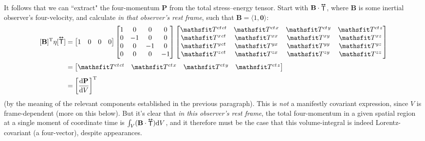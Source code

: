\documentclass[12pt]{article}
\renewcommand{\vv}[1]{\mathbf{#1}}
\newcommand{\dd}[1]{\mathrm{d}#1}
\newcommand{\tightoverset}[2]{%
  \mathop{#2}\limits^{\vbox to -.5ex{\kern-0.75ex\hbox{$#1$}\vss}}}
\newcommand{\inlinedy}[1]{\tightoverset{\text{\tiny$\bm\leftrightarrow$}}{#1}}
\newcommand{\capdy}[1]{ \overset{ \text{\tiny$\bm\leftrightarrow$} }{\vphantom{\text{\small{A}}}\smash{#1}} }
\begin{document}
It follows that we can ``extract" the four-momentum $\vv P$ from the total stress--energy tensor. Start with $\vv B \cdot {\inlinedy{\mathsf{T}}} $, where $\vv B$ is some inertial observer's four-velocity, and calculate \emph{in that observer's rest frame}, such that ${ \vv B = \langle 1, \vv 0 \rangle }$:
\begin{equation*}
\begin{aligned}
\, [ \vv B ]^{\mathrm{T}} \eta [ \capdy{\mathsf{T}}  ]
&=
\begin{bmatrix}
1 & 0 & 0 & 0
\end{bmatrix}
\begin{bmatrix}
1 & 0 & 0 & 0 \\
0 & -1 & 0 & 0 \\
0 & 0 & -1 & 0 \\
0 & 0 & 0 & -1
\end{bmatrix}
\begin{bmatrix}
\mathsfit T^{ct \mkern1.5mu ct} & \mathsfit T^{ct \mkern1.5mu x} & \mathsfit T^{ct \mkern1.5mu y} & \mathsfit T^{ct \mkern1.5mu z} \\
\mathsfit T^{x \mkern1.5mu ct} & \mathsfit T^{x x} & \mathsfit T^{x y} & \mathsfit T^{x z}  \\
\mathsfit T^{y \mkern1.5mu ct} & \mathsfit T^{y x} & \mathsfit T^{y y} & \mathsfit T^{y z}  \\
\mathsfit T^{z \mkern1.5mu ct} & \mathsfit T^{z x} & \mathsfit T^{z y} & \mathsfit T^{z z} 
\end{bmatrix}
\\[3pt]
&=
\begin{bmatrix}
\mathsfit T^{ct \mkern1.5mu ct} & \mathsfit T^{ct \mkern1.5mu x} & \mathsfit T^{ct \mkern1.5mu y} & \mathsfit T^{ct \mkern1.5mu z}
\end{bmatrix}
\\[3pt]
&=
\left[ \dfrac{\dd \vv P}{\dd V} \right]^{\mathrm{T}}
\end{aligned}
\end{equation*}
(by the meaning of the relevant components established in the previous paragraph). This is \emph{not} a manifestly covariant expression, since $V$ is frame-dependent (more on this below). But it's clear that \emph{in this observer's rest frame}, the total four-momentum in a given spatial region at a single moment of coordinate time is $\int_V (\vv B \cdot {\inlinedy{\mathsf{T}}}) \dd V$, and it therefore must be the case that this volume-integral is indeed Lorentz-covariant (a four-vector), despite appearances.
\end{document}
